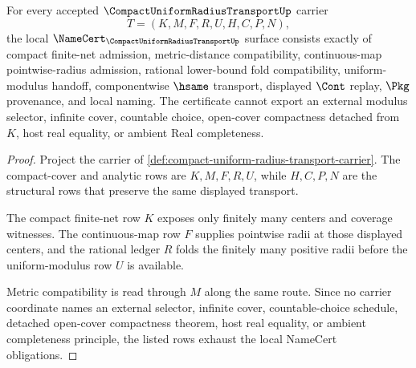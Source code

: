 \begin{theorem}
\label{thm:compact-uniform-radius-transport-namecert-obligations}
For every accepted $\CompactUniformRadiusTransportUp$ carrier
$$
T=(K,M,F,R,U,H,C,P,N),
$$
the local $\NameCert_{\CompactUniformRadiusTransportUp}$ surface consists exactly of compact finite-net admission, metric-distance compatibility, continuous-map pointwise-radius admission, rational lower-bound fold compatibility, uniform-modulus handoff, componentwise $\hsame$ transport, displayed $\Cont$ replay, $\Pkg$ provenance, and local naming. The certificate cannot export an external modulus selector, infinite cover, countable choice, open-cover compactness detached from $K$, host real equality, or ambient Real completeness.
\end{theorem}
\begin{proof}
Project the carrier of \autoref{def:compact-uniform-radius-transport-carrier}. The compact-cover and analytic rows are $K,M,F,R,U$, while $H,C,P,N$ are the structural rows that preserve the same displayed transport.

The compact finite-net row $K$ exposes only finitely many centers and coverage witnesses. The continuous-map row $F$ supplies pointwise radii at those displayed centers, and the rational ledger $R$ folds the finitely many positive radii before the uniform-modulus row $U$ is available.

Metric compatibility is read through $M$ along the same route. Since no carrier coordinate names an external selector, infinite cover, countable-choice schedule, detached open-cover compactness theorem, host real equality, or ambient completeness principle, the listed rows exhaust the local NameCert obligations.
\end{proof}

